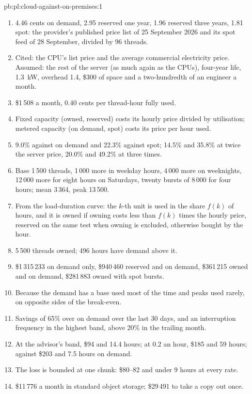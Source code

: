 \begin{solution}{pb:pl:cloud-against-on-premises:1}
\begin{enumerate}
\item 4.46 cents on demand, 2.95 reserved one year, 1.96 reserved three years, 1.81 spot: the provider's published price list of 25 September
2026 and its spot feed of 28 September, divided by 96 threads.
\item Cited: the CPU's list price and the average commercial electricity price. Assumed: the rest of the server (as much again as the CPUs),
four-year life, 1.3~kW, overhead 1.4, \$300 of space and a two-hundredth of an engineer a month.
\item \$1\,508 a month, 0.40 cents per thread-hour fully used.
\item Fixed capacity (owned, reserved) costs its hourly price divided by utilisation; metered capacity (on demand, spot) costs its price per
hour used.
\item 9.0\% against on demand and 22.3\% against spot; 14.5\% and 35.8\% at twice the server price, 20.0\% and 49.2\% at three times.
\item Base 1\,500 threads, 1\,000 more in weekday hours, 4\,000 more on weeknights, 12\,000 more for eight hours on Saturdays, twenty bursts of
8\,000 for four hours; mean 3\,364, peak 13\,500.
\item From the load-duration curve: the $k$-th unit is used in the share $f(k)$ of hours, and it is owned if owning costs less than $f(k)$ times
the hourly price, reserved on the same test when owning is excluded, otherwise bought by the hour.
\item 5\,500 threads owned; 496 hours have demand above it.
\item \$1\,315\,233 on demand only, \$940\,460 reserved and on demand, \$361\,215 owned and on demand, \$281\,883 owned with spot bursts.
\item Because the demand has a base used most of the time and peaks used rarely, on opposite sides of the break-even.
\item Savings of 65\% over on demand over the last 30 days, and an interruption frequency in the highest band, above 20\% in the trailing
month.
\item At the advisor's band, \$94 and 14.4 hours; at 0.2 an hour, \$185 and 59 hours; against \$203 and 7.5 hours on demand.
\item The loss is bounded at one chunk: \$80--82 and under 9 hours at every rate.
\item \$11\,776 a month in standard object storage; \$29\,491 to take a copy out once.

\end{enumerate}
\end{solution}
